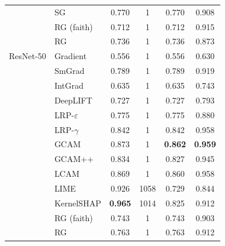 \begin{tabular}{@{}l l c c c c@{}}
 & SG & 0.770 & 1 & 0.770 & 0.908 \\
 & RG (faith) & 0.712 & 1 & 0.712 & 0.915 \\
 & RG & 0.736 & 1 & 0.736 & 0.873 \\
\midrule
ResNet-50 & Gradient & 0.556 & 1 & 0.556 & 0.630 \\
 & SmGrad & 0.789 & 1 & 0.789 & 0.919 \\
 & IntGrad & 0.635 & 1 & 0.635 & 0.743 \\
 & DeepLIFT & 0.727 & 1 & 0.727 & 0.793 \\
 & LRP-$\varepsilon$ & 0.775 & 1 & 0.775 & 0.880 \\
 & LRP-$\gamma$ & 0.842 & 1 & 0.842 & 0.958 \\
 & GCAM & 0.873 & 1 & \textbf{0.862} & \textbf{0.959} \\
 & GCAM++ & 0.834 & 1 & 0.827 & 0.945 \\
 & LCAM & 0.869 & 1 & 0.860 & 0.958 \\
 & LIME & 0.926 & 1058 & 0.729 & 0.844 \\
 & KernelSHAP & \textbf{0.965} & 1014 & 0.825 & 0.912 \\
 & RG (faith) & 0.743 & 1 & 0.743 & 0.903 \\
 & RG & 0.763 & 1 & 0.763 & 0.912 \\
\bottomrule
\end{tabular}
